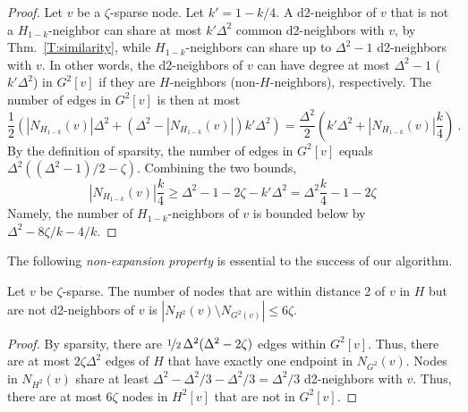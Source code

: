  \begin{proof}
 Let $v$ be a $\zeta$-sparse node.
Let $k' = 1 - k/4$.
A d2-neighbor of $v$ that is not a $H_{1-k}$-neighbor can share at most $k' \Delta^2$ common d2-neighbors with $v$, by Thm.~\ref{T:similarity}, while $H_{1-k}$-neighbors can share up to $\Delta^2-1$ d2-neighbors with $v$.
In other words, the d2-neighbors of $v$ can have degree at most 
$\Delta^2-1$ ($k'\Delta^2$) in $G^2[v]$ if they are $H$-neighbors (non-$H$-neighbors), respectively.
The number of edges in $G^2[v]$ is then at most
\[ \frac{1}{2}\left( |N_{H_{1-k}}(v)| \Delta^2 + (\Delta^2 - |N_{H_{1-k}}(v)|) k' \Delta^2\right) = 
\frac{\Delta^2}{2} \left(k' \Delta^2 + |N_{H_{1-k}}(v)| \frac{k}{4}\right) \ . \]
By the definition of sparsity, the number of edges in $G^2[v]$ equals $\Delta^2((\Delta^2-1)/2 - \zeta)$.
Combining the two bounds, 
\[ |N_{H_{1-k}}(v)| \frac{k}{4} \ge \Delta^2 - 1 - 2\zeta - k'\Delta^2 
  = \Delta^2 \frac{k}{4}  - 1 - 2\zeta \]
Namely, the number of $H_{1-k}$-neighbors of $v$ is bounded below by $\Delta^2 - 8\zeta/k -4/k$.
%
\end{proof}

The following \emph{non-expansion property} is essential to the success of our algorithm.

\begin{lemma}
Let $v$ be $\zeta$-sparse.
The number of nodes that are within distance 2 of $v$ in $H$ but are not d2-neighbors of $v$ is
$|N_{H^2}(v) \setminus N_{G^2(v)}| \le 6\zeta$.
\label{L:h2}
\end{lemma}
%
\begin{proof}
By sparsity, there are $\nicefrac{1}{2}\, \Delta^2(\Delta^2 - 2\zeta)$ edges within $G^2[v]$. Thus, there are at most $2\zeta \Delta^2$ edges of $H$ that have exactly one endpoint in $N_{G^2}(v)$. Nodes in $N_{H^2}(v)$ share at least $\Delta^2 - \Delta^2/3 - \Delta^2/3 = \Delta^2/3$ d2-neighbors with $v$. Thus, there are at most $6\zeta$ nodes in $H^2[v]$ that are not in $G^2[v]$.
\end{proof}

